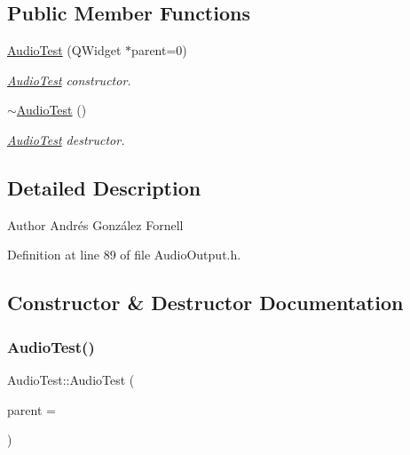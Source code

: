 \subsection*{Public Member Functions}
\begin{DoxyCompactItemize}
\item 
\hyperlink{class_audio_test_a8732c48308ca1352a4d89803553b395e}{Audio\+Test} (Q\+Widget $\ast$parent=0)
\begin{DoxyCompactList}\small\item\em \hyperlink{class_audio_test}{Audio\+Test} constructor. \end{DoxyCompactList}\item 
\mbox{\label{class_audio_test_ae37879db71b1540d84aa37a093978192}} 
\hyperlink{class_audio_test_ae37879db71b1540d84aa37a093978192}{$\sim$\+Audio\+Test} ()
\begin{DoxyCompactList}\small\item\em \hyperlink{class_audio_test}{Audio\+Test} destructor. \end{DoxyCompactList}\end{DoxyCompactItemize}


\subsection{Detailed Description}
\begin{DoxyAuthor}{Author}
Andrés González Fornell 
\end{DoxyAuthor}


Definition at line 89 of file Audio\+Output.\+h.



\subsection{Constructor \& Destructor Documentation}
\mbox{\label{class_audio_test_a8732c48308ca1352a4d89803553b395e}} 
\subsubsection{\texorpdfstring{Audio\+Test()}{AudioTest()}}
{\footnotesize\ttfamily Audio\+Test\+::\+Audio\+Test (\begin{DoxyParamCaption}\item[{Q\+Widget $\ast$}]{parent = {} }\end{DoxyParamCaption})}


